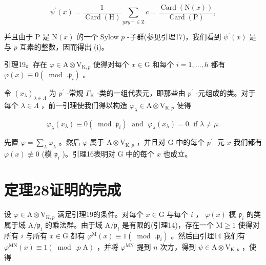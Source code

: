 \documentclass[10pt]{article}
\begin{document}
\[
{\psi }^{\prime }\left( x\right)  = \frac{1}{\operatorname{Card}\left( \mathrm{H}\right) }\mathop{\sum }\limits_{{{yx}{y}^{-1} \in  \mathrm{Z}}}c = \frac{\operatorname{Card}\left( {\mathrm{N}\left( x\right) }\right) }{\operatorname{Card}\left( \mathrm{P}\right) },
\]

并且由于 \(\mathrm{P}\) 是 \(\mathrm{N}\left( x\right)\) 的一个 Sylow \(p\) -子群(参见引理17)，我们看到 \({\psi }^{\prime }\left( x\right)\) 是与 \(p\) 互素的整数，因而得出 (i)。

引理19。存在 \(\varphi  \in  \mathrm{A} \otimes  {\mathrm{V}}_{\mathrm{K},p}\) 使得对每个 \(x \in  \mathrm{G}\) 和每个 \(i = 1,\ldots ,h\) 都有 \(\varphi \left( x\right)  \equiv  0\left( {\;\operatorname{mod}\;.{\mathfrak{p}}_{i}}\right)\) 。

令 \({\left( {x}_{\lambda }\right) }_{\lambda  \in  \Lambda }\) 为 \({p}^{\prime }\) -常规 \({\Gamma }_{\mathrm{K}}\) -类的一组代表元，即那些由 \({p}^{\prime }\) -元组成的类。对于每个 \(\lambda  \in  \Lambda\) ，前一引理使我们得以构造 \({\varphi }_{\lambda } \in  \mathrm{A} \otimes  {\mathrm{V}}_{\mathrm{K},p}\) 使得

\[
{\varphi }_{\lambda }\left( {x}_{\lambda }\right)  \equiv  0\left( {\;\operatorname{mod}\;{\mathfrak{p}}_{i}}\right) \;\text{ and }\;{\varphi }_{\lambda }\left( {x}_{\lambda }\right)  = 0\;\text{ if }\lambda  \neq  \mu .
\]

先置 \(\varphi  = \mathop{\sum }\limits_{\lambda }{\varphi }_{\lambda }\) 。然后 \(\varphi\) 属于 \(\mathrm{A} \otimes  {\mathrm{V}}_{\mathrm{K},p}\) ，并且对 G 中的每个 \({p}^{\prime }\) -元 \(x\) 我们都有 \(\varphi \left( x\right)  \text{ ≢ } 0\) (模 \({\mathfrak{p}}_{i}\) )。引理16表明对 \(\mathrm{G}\) 中的每个 \(x\) 也成立。

\section*{定理28证明的完成}

设 \(\varphi  \in  \mathrm{A} \otimes  {\mathrm{V}}_{\mathrm{K},p}\) 满足引理19的条件。对每个 \(x \in  \mathrm{G}\) 与每个 \(i\) ， \(\varphi \left( x\right)\) 模 \({\mathfrak{p}}_{i}\) 的类属于域 \(\mathrm{A}/{\mathfrak{p}}_{i}\) 的乘法群。由于域 \(\mathrm{A}/{\mathfrak{p}}_{i}\) 是有限的(引理14)，存在一个 \(\mathrm{M} \geq  1\) 使得对所有 \(i\) 与所有 \(x \in  \mathrm{G}\) 都有 \({\varphi }^{\mathrm{M}}\left( x\right)  \equiv  1\left( {\;\operatorname{mod}\;.{\mathfrak{p}}_{i}}\right)\) 。然后由引理14 我们有 \({\varphi }^{\mathrm{{MN}}}\left( x\right)  \equiv  1\left( {{\;\operatorname{mod}\;.}p\mathrm{\;A}}\right)\) ，并将 \({\varphi }^{\mathrm{{MN}}}\) 提到 \(n\) 次方，得到 \(\psi  \in  \mathrm{A} \otimes  {\mathrm{V}}_{\mathrm{K},p}\) ，使得
\end{document}
